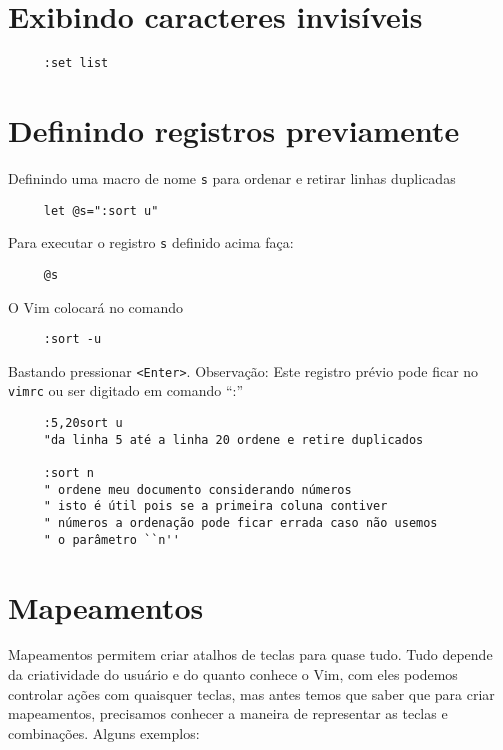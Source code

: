 
\section{Exibindo caracteres invisíveis}
\label{Exibindo caracteres invisíveis}

\begin{verbatim}
     :set list
\end{verbatim}

\section{Definindo registros previamente}
\label{Definindo registros previamente}
Definindo uma macro de nome \verb|s| para ordenar e retirar linhas duplicadas

\begin{verbatim}
     let @s=":sort u"
\end{verbatim}

Para executar o registro \verb|s| definido acima faça:

\begin{verbatim}
     @s
\end{verbatim}

O Vim colocará no comando

\begin{verbatim}
     :sort -u
\end{verbatim}

Bastando pressionar \verb|<Enter>|.  Observação: Este registro prévio pode
ficar no \texttt{vimrc} ou ser digitado em comando ``:''


\begin{verbatim}
     :5,20sort u
     "da linha 5 até a linha 20 ordene e retire duplicados
     
     :sort n
     " ordene meu documento considerando números
     " isto é útil pois se a primeira coluna contiver
     " números a ordenação pode ficar errada caso não usemos
     " o parâmetro ``n''
\end{verbatim}

\section{Mapeamentos}\label{Mapeamentos}

Mapeamentos permitem criar atalhos de teclas para quase tudo. Tudo depende da
criatividade do usuário e do quanto conhece o Vim, com eles podemos controlar ações
com quaisquer teclas, mas antes temos que saber que para criar mapeamentos,
precisamos conhecer a maneira de representar as teclas e combinações. Alguns
exemplos:

